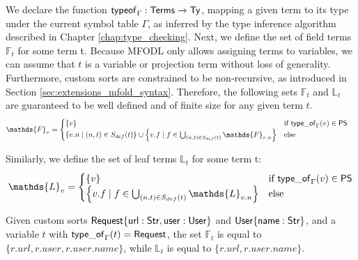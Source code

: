 We declare the function $\mathsf{typeof}_{\Gamma} : \mathsf{Terms} \to \mathsf{Ty}$, mapping a given term to its type under the current symbol table $\Gamma$, as inferred by the type inference algorithm described in Chapter \ref{chap:type_checking}.
Next, we define the set of field terms $\mathds{F}_t$ for some term t. Because MFODL only allows assigning terms to variables, we can assume that $t$ is a variable or projection term without loss of generality. Furthermore, custom sorts are constrained to be non-recursive, as introduced in Section \ref{sec:extensions_mfold_syntax}. Therefore, the following sets $\mathds{F}_t$ and $\mathds{L}_t$ are guaranteed to be well defined and of finite size for any given term $t$.
\begin{align*}
	 & \mathds{F}_v = \begin{cases}
		                  \{v\}                                                                                                                               & \text{if } \mfodlTypeOf{v} \in \mfodlPrimitiveSorts \\
		                  \left\{ v.n \mid (n,t) \in S_{def}(t) \right\} \cup \left\{ v.f \mid f \in \bigcup_{(n,t) \in S_{def}(t)} \mathds{F}_{v.n} \right\} & \text{else}                                         \\
	                  \end{cases}
\end{align*}

Similarly, we define the set of leaf terms $\mathds{L}_t$ for some term t:
\begin{align*}
	\mathds{L}_v = \begin{cases}
		               \{v\}                                                                           & \text{if } \mfodlTypeOf{v} \in \mfodlPrimitiveSorts \\
		               \left\{ v.f \mid f \in \bigcup_{(n,t) \in S_{def}(t)} \mathds{L}_{v.n} \right\} & \text{else}                                         \\
	               \end{cases}
\end{align*}

\begin{example}
	\label{ex:field_leaf_terms}
	Given custom sorts $\mathsf{Request}\{ \mathsf{url} : \mathsf{Str}, \mathsf{user} : \mathsf{User} \}$ and $\mathsf{User} \{ \mathsf{name} : \mathsf{Str} \}$, and a variable $t$ with $\mathsf{type\_of}_{\Gamma}(t) = \mathsf{Request}$, the set $\mathds{F}_t$ is equal to \\  $\{ r.url, r.user, r.user.name \}$, while $\mathds{L}_t$ is equal to $\{ r.url, r.user.name \}$.
\end{example}

